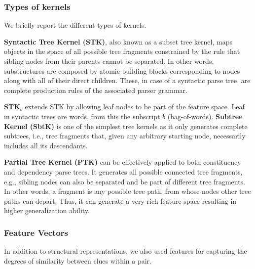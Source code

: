 \documentclass{wileysev}
\begin{document}
\subsubsection{Types of kernels}
We briefly report the different types of kernels.

\textbf{Syntactic Tree Kernel (STK)}, also known as a subset tree kernel, maps objects in the space of all possible tree fragments  constrained by the rule that sibling nodes from their parents cannot be separated. In other words, substructures are composed by atomic building blocks corresponding to nodes along with all of their direct children. These, in case of a syntactic parse tree, are complete production rules of the associated parser grammar.

\textbf{STK$_{b}$} extends STK by allowing leaf nodes to be part of the feature space. Leaf in syntactic trees are words, from this the subscript $b$ (bag-of-words). \textbf{Subtree Kernel (SbtK)} is one of the simplest tree kernels as it only generates complete subtrees, i.e., tree fragments that, given any arbitrary starting node, necessarily includes all its descendants.

\textbf{Partial Tree Kernel (PTK)} can be effectively applied to both constituency and dependency parse trees. It generates all possible connected tree fragments, e.g., sibling nodes can also be separated and be part of different tree fragments. In other words, a fragment is any possible tree path, from whose nodes other tree paths can depart. Thus, it can generate a very rich feature space resulting in higher generalization ability.
 
\subsubsection{Feature Vectors}
In addition to structural representations, we also used features for capturing the degrees of similarity between clues within a pair.
\end{document}
